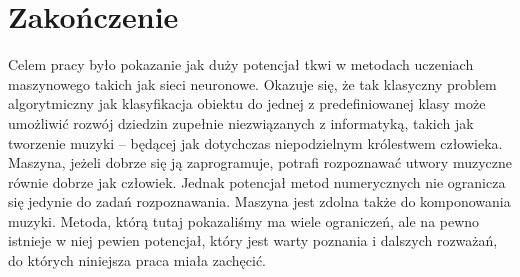 \chapter*{Zakończenie}
\noindent Celem pracy było pokazanie jak duży potencjał tkwi w metodach uczeniach maszynowego takich jak sieci neuronowe. Okazuje się, że tak klasyczny problem algorytmiczny jak klasyfikacja obiektu do jednej z predefiniowanej klasy może umożliwić rozwój dziedzin zupełnie niezwiązanych z informatyką, takich jak tworzenie muzyki -- będącej jak dotychczas niepodzielnym królestwem człowieka. Maszyna, jeżeli dobrze się ją zaprogramuje, potrafi rozpoznawać utwory muzyczne równie dobrze jak człowiek. 
Jednak potencjał metod numerycznych nie ogranicza się jedynie do zadań rozpoznawania. Maszyna jest zdolna także do komponowania muzyki. Metoda, którą tutaj pokazaliśmy ma wiele ograniczeń, ale na pewno istnieje w niej pewien potencjał, który jest warty poznania i dalszych rozważań, do których niniejsza praca miała zachęcić.